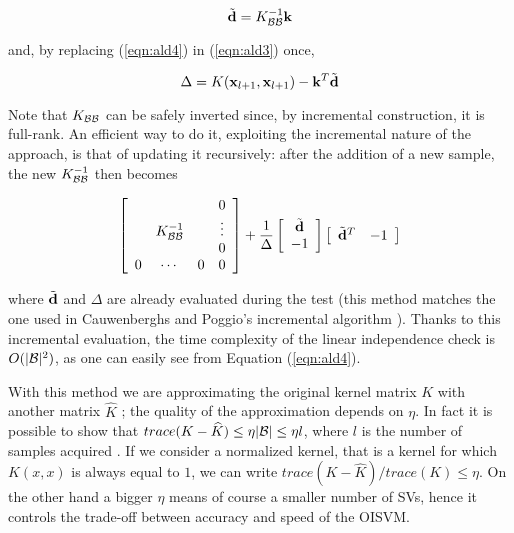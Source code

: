 \begin{equation} \label{eqn:ald4}
  \tilde{\mathbf{d}} = K_{\mathcal{B}\mathcal{B}}^{-1} \mathbf{k} \\
\end{equation}

\noindent and, by replacing (\ref{eqn:ald4}) in (\ref{eqn:ald3}) once,

\begin{equation} \label{eqn:ald5}
  \Delta = K(\mathbf{x}_{l+1},\mathbf{x}_{l+1}) - \mathbf{k}^T \tilde{\mathbf{d}}
\end{equation}

Note that $K_{\mathcal{B}\mathcal{B}}$ can be safely inverted since, by incremental
construction, it is full-rank. An efficient way to do it, exploiting
the incremental nature of the approach, is that of updating it
recursively: after the addition of a new sample, the new
$K_{\mathcal{B}\mathcal{B}}^{-1}$ then becomes

\begin{equation} \label{eqn:inv_upd}
  \left[\begin{array}{cccc}
       &               &   & 0 \\
       & K_{\mathcal{B}\mathcal{B}}^{-1} &   & \vdots \\
       &               &   & 0 \\
     0 &       \cdots  & 0 & 0
  \end{array}\right]
  +
  \frac{1}{\Delta}
  \left[\begin{array}{c}
    \tilde{\mathbf{d}} \\
    -1
  \end{array}\right]
  \left[\begin{array}{cc}
    \tilde{\mathbf{d}}^T & -1
  \end{array}\right]
\end{equation}

\noindent where $\tilde{\mathbf{d}}$ and $\Delta$ are already evaluated during the
test (this method matches the one used in Cauwenberghs and Poggio's
incremental algorithm \cite{CauwenberghsP00}). Thanks to this
incremental evaluation, the time complexity of the linear independence
check is $O(|\mathcal{B}|^2)$, as one can easily see from Equation
(\ref{eqn:ald4}).

With this method we are approximating the original kernel matrix $K$
with another matrix $\widehat{K}$ \cite{BachJordan2005};
the quality of the approximation
depends on $\eta$. In fact it is possible to show that
$trace(K-\widehat{K}) \leq \eta |\mathcal{B}| \leq \eta l$, where $l$ is the number
of samples acquired \cite{engel2004}. If we consider a normalized kernel,
that is a kernel for which $K(x,x)$ is always equal to $1$, we can write
$trace(K-\widehat{K})/trace(K) \leq \eta$.
On the other hand a bigger $\eta$ means of course a smaller number
of SVs, hence it controls the trade-off between accuracy and
speed of the OISVM.


